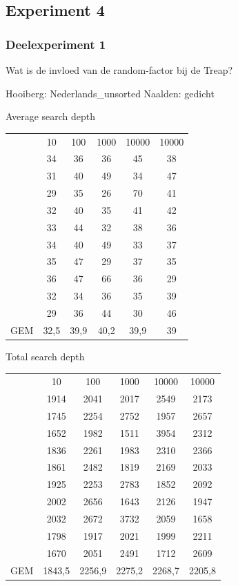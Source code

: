 \documentclass[a4paper,10pt]{article}
\begin{document}
\subsection{Experiment 4}
\subsubsection{Deelexperiment 1}
Wat is de invloed van de random-factor bij de Treap?

Hooiberg:
Nederlands\_unsorted
Naalden:
gedicht

Average search depth \\
\begin{center}
\begin{tabular}{c c c c c c}
 & 10 & 100 & 1000 & 10000 & 10000 \\
 & 34 & 36 & 36 & 45 & 38 \\
 & 31 & 40 & 49 & 34 & 47 \\
 & 29 & 	35 & 26 & 70 & 41 \\
 & 32 & 	40 & 35 & 41 & 42 \\
 & 33 & 	44 & 32 & 38 & 36 \\
 & 34 & 	40 & 49 & 33 & 37 \\
 & 35 & 	47 & 29 & 37 & 35 \\
 & 36 & 	47 & 66 & 36 & 29 \\
 & 32 & 	34 & 36 & 35 & 39 \\
 & 29 & 	36 & 44 & 30 & 46 \\
GEM & 32,5 & 39,9 & 40,2 & 39,9 & 39 \\
\end{tabular}
\end{center}
Total search depth \\
\begin{center}
\begin{tabular}{c c c c c c}
 & 10 & 100 & 1000 & 10000 & 10000 \\
 & 1914 & 2041 & 2017 & 2549 & 2173 \\
 & 1745 & 2254 & 2752 & 1957 & 2657 \\
 & 1652 & 1982 & 1511 & 3954 & 2312 \\
 & 1836 & 2261 & 1983 & 2310 & 2366 \\
 & 1861 & 2482 & 1819 & 2169 & 2033 \\
 & 1925 & 2253 & 2783 & 1852 & 2092 \\
 & 2002 & 2656 & 1643 & 2126 & 1947 \\
 & 2032 & 2672 & 3732 & 2059 & 1658 \\
 & 1798 & 1917 & 2021 & 1999 & 2211 \\
 & 1670 & 2051 & 2491 & 1712 & 2609 \\
GEM & 1843,5 & 2256,9 & 2275,2 & 2268,7 & 2205,8 \\
\end{tabular}
\end{center}
\end{document}
